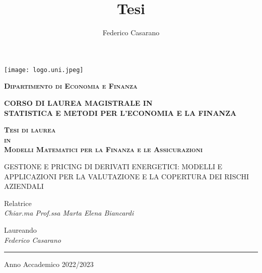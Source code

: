 \documentclass[12pt,a4paper]{report}
\title{Tesi}
\author{Federico Casarano}
\date{}
\begin{document}
\begin{titlepage}
    \centering
    
    \texttt{[image: logo.uni.jpeg]}
    
    \vspace{1cm}
    
    \textsc{\textbf{\fontsize{12}{14}\selectfont \textcolor{myblue}{Dipartimento di Economia e Finanza}}}
    
    \vspace{0.5cm}
    
    \textsc{\textbf{\fontsize{12}{14}\selectfont \textcolor{myblue}{CORSO DI LAUREA MAGISTRALE IN\\STATISTICA E METODI PER L'ECONOMIA E LA FINANZA}}}
    
    \vspace{1cm}
    
    \textsc{\textbf{\fontsize{14}{16}\selectfont Tesi di laurea \\in \\
    \vspace{0.5cm}
    Modelli Matematici per la Finanza e le Assicurazioni}}
    
    \vspace{2cm}
    
    {\Large\fontsize{12}{14}\selectfont GESTIONE E PRICING DI DERIVATI ENERGETICI: MODELLI E APPLICAZIONI PER LA VALUTAZIONE E LA COPERTURA DEI RISCHI AZIENDALI}
    
    \vspace{2cm}
    
    \begin{flushleft}
        Relatrice\\
        \textit{\fontsize{14}{16}\selectfont Chiar.ma Prof.ssa Marta Elena Biancardi}
    \end{flushleft}
    
    \vfill
    
    \begin{flushright}
        Laureando\\
        \textit{\fontsize{14}{16}\selectfont Federico Casarano}
    \end{flushright}
    
    \vspace{0.5cm}
    
    \hrule
    
    \vspace{0.5cm}
    
    \fontsize{14}{16}\selectfont Anno Accademico 2022/2023
    
\end{titlepage}
\end{document}
